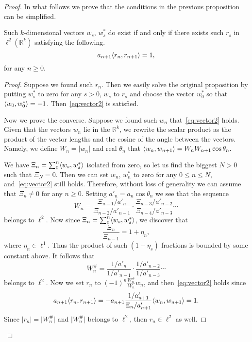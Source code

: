 \begin{proof}
    In what follows we prove that the conditions in the previous proposition can be simplified.
    \begin{prop}
      \label{prop:reformulation-lw}
      Such $k$-dimensional vectors $w_s$, $w^*_s$ do exist if and only if there exists such $r_s$ in $\ell^2(\mathbb{R}^k)$
        satisfying the following.
      \begin{equation}
        \label{eq:vector3}
        a_{n+1} \langle r_n, r_{n+1} \rangle = 1,
      \end{equation}
      for any $n \geq 0$.
    \end{prop}
    \begin{proof}
      Suppose we found such $r_n$.
      Then we easily solve the original proposition by putting $w^*_s$ to zero for any $s > 0$, $w_s$ to $r_s$ and
        choose the vector $w^*_0$ so that $\langle w_0, w^*_0 \rangle = -1$.
      Then~\eqref{eq:vector2} is satisfied.

      Now we prove the converse.
      Suppose we found such $w_n$ that~\eqref{eq:vector2} holds.
      Given that the vectors $w_n$ lie in the $\mathbb{R}^k$, we rewrite the scalar product as
        the product of the vector lengths and the cosine of the angle between the vectors.
      Namely, we define $W_n = \lvert w_n\rvert$ and real $\theta_n$ that
        $\langle w_{n}, w_{n+1} \rangle = W_n W_{n+1} \cos{\theta_n}.$

      We have $\Xi_n = \sum_0^n \langle w_s, w^*_s \rangle$ isolated from zero, so let us
        find the biggest $N > 0$ such that $\Xi_N = 0$.
      Then we can set $w_n$, $w^*_n$ to zero for any $0 \leq n \leq N$, and~\eqref{eq:vector2}
        still holds.
      Therefore, without loss of generality we can assume that $\Xi_n \neq 0$ for any $n \geq 0$.
      Setting $a'_n = a_n \cos{\theta_n}$ we see that the sequence
      \[
        W_n = \frac{\Xi_{n-1}/a'_n}{\Xi_{n-2}/a'_{n-1}} \cdot \frac{\Xi_{n-3}/a'_{n-2}}{\Xi_{n-4}/a'_{n-3}} \cdots
      \]
        belongs to $\ell^2$.
      Now since $\Xi_n = \sum_0^n \langle w_s, w^*_s \rangle$, we discover that
      \[
        \frac{\Xi_n}{\Xi_{n-1}} = 1 + \eta_n,
      \]
        where $\eta_n \in \ell^1$.
      Thus the product of such $(1 + \eta_s)$ fractions is bounded by some constant above.
      It follows that
      \[
        W^\#_n = \frac{1/a'_n}{1/a'_{n-1}} \cdot \frac{1/a'_{n-2}}{1/a'_{n-3}} \cdots
      \]
        belongs to $\ell^2$.
      Now we set $r_n$ to $(-1)^n\frac{W^\#_n}{W_n}w_n$, and then~\eqref{eq:vector2} holds since
      \[
        a_{n+1} \langle r_n, r_{n+1} \rangle = -a_{n+1} \frac{1/a'_{n+1}}{\Xi_n/a'_{n+1}} \langle w_n, w_{n+1} \rangle = 1.
      \]
      Since $\lvert r_n \rvert = \lvert W^\#_n \rvert$ and $\lvert W^\#_n \rvert$ belongs to $\ell^2$,
        then $r_n \in \ell^2$ as well.
    \end{proof}


\end{proof}
